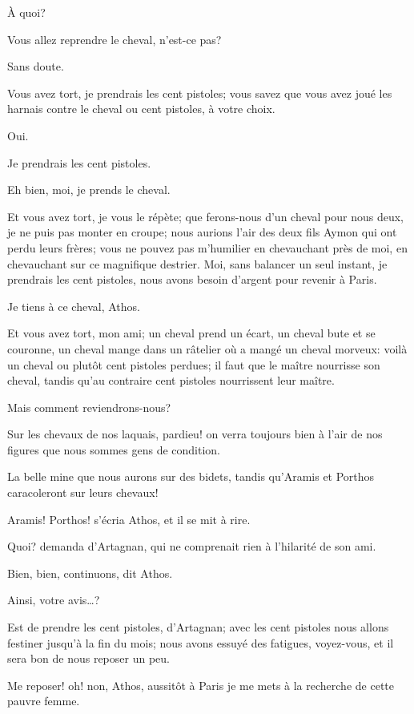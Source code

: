 \speak  À quoi? 

\speak  Vous allez reprendre le cheval, n'est-ce pas? 

\speak  Sans doute. 

\speak  Vous avez tort, je prendrais les cent pistoles; vous savez que vous avez joué les harnais contre le cheval ou cent pistoles, à votre choix. 

\speak  Oui. 

\speak  Je prendrais les cent pistoles. 

\speak  Eh bien, moi, je prends le cheval. 

\speak  Et vous avez tort, je vous le répète; que ferons-nous d'un cheval pour nous deux, je ne puis pas monter en croupe; nous aurions l'air des deux fils Aymon qui ont perdu leurs frères; vous ne pouvez pas m'humilier en chevauchant près de moi, en chevauchant sur ce magnifique destrier. Moi, sans balancer un seul instant, je prendrais les cent pistoles, nous avons besoin d'argent pour revenir à Paris. 

\speak  Je tiens à ce cheval, Athos. 

\speak  Et vous avez tort, mon ami; un cheval prend un écart, un cheval bute et se couronne, un cheval mange dans un râtelier où a mangé un cheval morveux: voilà un cheval ou plutôt cent pistoles perdues; il faut que le maître nourrisse son cheval, tandis qu'au contraire cent pistoles nourrissent leur maître. 

\speak  Mais comment reviendrons-nous? 

\speak  Sur les chevaux de nos laquais, pardieu! on verra toujours bien à l'air de nos figures que nous sommes gens de condition. 

\speak  La belle mine que nous aurons sur des bidets, tandis qu'Aramis et Porthos caracoleront sur leurs chevaux! 

\speak  Aramis! Porthos! s'écria Athos, et il se mit à rire. 

\speak  Quoi? demanda d'Artagnan, qui ne comprenait rien à l'hilarité de son ami. 

\speak  Bien, bien, continuons, dit Athos. 

\speak  Ainsi, votre avis\dots? 

\speak  Est de prendre les cent pistoles, d'Artagnan; avec les cent pistoles nous allons festiner jusqu'à la fin du mois; nous avons essuyé des fatigues, voyez-vous, et il sera bon de nous reposer un peu. 

\speak  Me reposer! oh! non, Athos, aussitôt à Paris je me mets à la recherche de cette pauvre femme. 

